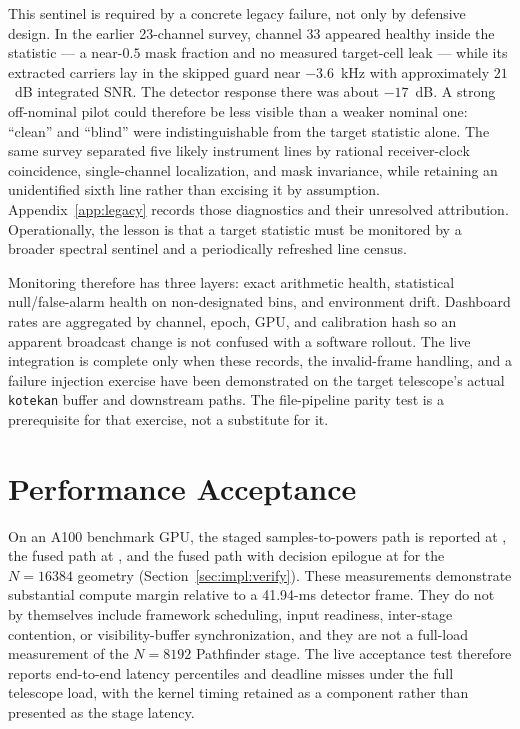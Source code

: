 This sentinel is required by a concrete legacy failure, not only by defensive
design.  In the earlier 23-channel survey, channel 33 appeared healthy inside
the statistic --- a near-$0.5$ mask fraction and no measured target-cell leak ---
while its extracted carriers lay in the skipped guard near $-3.6$~kHz with
approximately $21$~dB integrated SNR.  The detector response there was about
$-17$~dB.  A strong off-nominal pilot could therefore be less visible than a
weaker nominal one: ``clean'' and ``blind'' were indistinguishable from the
target statistic alone.  The same survey separated five likely instrument
lines by rational receiver-clock coincidence, single-channel localization, and
mask invariance, while retaining an unidentified sixth line rather than
excising it by assumption.  Appendix~\ref{app:legacy} records those diagnostics
and their unresolved attribution.  Operationally, the lesson is that a target
statistic must be monitored by a broader spectral sentinel and a periodically
refreshed line census.

Monitoring therefore has three layers: exact arithmetic health, statistical
null/false-alarm health on non-designated bins, and environment drift.  Dashboard
rates are aggregated by channel, epoch, GPU, and calibration hash so an apparent
broadcast change is not confused with a software rollout.  The live integration
is complete only when these records, the invalid-frame handling, and a failure
injection exercise have been demonstrated on the target telescope's actual
\texttt{kotekan} buffer and downstream paths.  The file-pipeline parity test
is a prerequisite for that exercise, not a substitute for it.

\section{Performance Acceptance}
\label{sec:deployment:performance}

On an A100 benchmark GPU, the staged samples-to-powers path is reported at
, the fused path at , and the fused path with
decision epilogue at  for the $N=16384$ geometry
(Section~\ref{sec:impl:verify}).  These measurements demonstrate substantial
compute margin relative to a 41.94-ms detector frame.  They do not by themselves
include framework scheduling, input readiness, inter-stage contention, or
visibility-buffer synchronization, and they are not a full-load measurement of
the $N=8192$ Pathfinder stage.  The live acceptance test therefore reports
end-to-end latency percentiles and deadline misses under the full telescope load,
with the kernel timing retained as a component rather than presented as the
stage latency.

